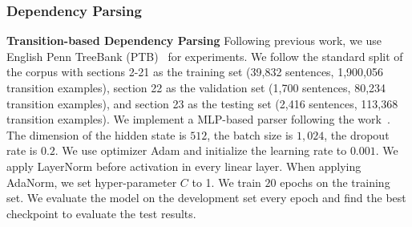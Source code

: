 \documentclass{article}
\begin{document}
\subsubsection{Dependency Parsing}
\textbf{Transition-based Dependency Parsing} Following previous work, we use English Penn TreeBank (PTB)~\citep{DBLP:journals/coling/MarcusSM94} for experiments. We follow the standard split of the corpus with sections 2-21 as the training set (39,832 sentences, 1,900,056 transition examples), section 22 as the validation set (1,700 sentences, 80,234 transition examples), and section 23 as the testing set (2,416 sentences, 113,368 transition examples). We implement a  MLP-based parser following the work~\citep{DBLP:conf/emnlp/ChenM14}.   The dimension of the hidden state is $512$, the batch size is $1,024$, the dropout rate is $0.2$. We use optimizer Adam and initialize the learning rate to $0.001$. We apply LayerNorm before activation in every linear layer. When applying AdaNorm, we set hyper-parameter $C$ to 1. We train $20$ epochs on the training set. We evaluate the model on the development set every epoch and find the best checkpoint to evaluate the test results.




\clearpage
\end{document}
